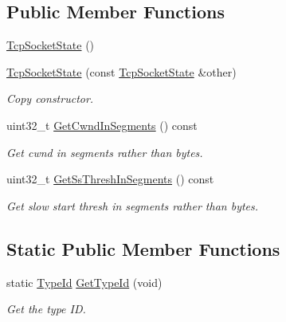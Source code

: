 \subsection*{Public Member Functions}
\begin{DoxyCompactItemize}
\item 
\hyperlink{classns3_1_1TcpSocketState_aa88a545b660d9a6ce28576522829bbf6}{Tcp\+Socket\+State} ()
\item 
\hyperlink{classns3_1_1TcpSocketState_a8d239d86f16a1bf17f1ed3458f08cd5c}{Tcp\+Socket\+State} (const \hyperlink{classns3_1_1TcpSocketState}{Tcp\+Socket\+State} \&other)
\begin{DoxyCompactList}\small\item\em Copy constructor. \end{DoxyCompactList}\item 
uint32\+\_\+t \hyperlink{classns3_1_1TcpSocketState_ab6dfe309ca53fd3207dcafede75ad12d}{Get\+Cwnd\+In\+Segments} () const 
\begin{DoxyCompactList}\small\item\em Get cwnd in segments rather than bytes. \end{DoxyCompactList}\item 
uint32\+\_\+t \hyperlink{classns3_1_1TcpSocketState_a213dafca207a5d2b1d72d3b6caafbd7b}{Get\+Ss\+Thresh\+In\+Segments} () const 
\begin{DoxyCompactList}\small\item\em Get slow start thresh in segments rather than bytes. \end{DoxyCompactList}\end{DoxyCompactItemize}
\subsection*{Static Public Member Functions}
\begin{DoxyCompactItemize}
\item 
static \hyperlink{classns3_1_1TypeId}{Type\+Id} \hyperlink{classns3_1_1TcpSocketState_af48304b9a8dc7099f802a3d6d2ab0db2}{Get\+Type\+Id} (void)
\begin{DoxyCompactList}\small\item\em Get the type ID. \end{DoxyCompactList}\end{DoxyCompactItemize}

